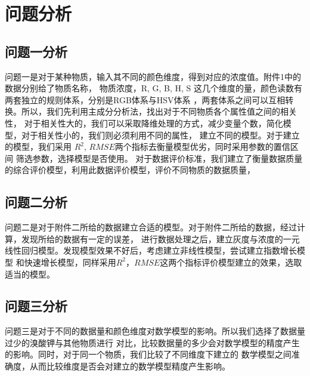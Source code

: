 \section{问题分析}
\subsection{问题一分析}
问题一是对于某种物质，输入其不同的颜色维度，得到对应的浓度值。附件1中的数据分别给了物质名称，
物质浓度，R, G, B, H, S 这几个维度的量，颜色读数有两套独立的规则体系，分别是RGB体系与HSV体系
，两套体系之间可以互相转换。所以，我们先利用主成分分析法，找出对于不同物质各个属性值之间的相关性，
对于相关性大的，我们可以采取降维处理的方式，减少变量个数，简化模型，对于相关性小的，我们则必须利用不同的属性，
建立不同的模型。对于建立的模型，我们采用 $R^2$, $RMSE$两个指标去衡量模型优劣，同时采用参数的置信区间
筛选参数，选择模型是否使用。
对于数据评价标准，我们建立了衡量数据质量的综合评价模型，利用此数据评价模型，评价不同物质的数据质量，

\subsection{问题二分析}
问题二是对于附件二所给的数据建立合适的模型。对于附件二所给的数据，经过计算，发现所给的数据有一定的误差，
进行数据处理之后，建立灰度与浓度的一元线性回归模型。发现模型效果不好后，考虑建立非线性模型，尝试建立指数增长模型
和快速增长模型，同样采用$R^2$，$RMSE$这两个指标评价模型建立的效果，选取适当的模型。

\subsection{问题三分析}
问题三是对于不同的数据量和颜色维度对数学模型的影响。所以我们选择了数据量过少的溴酸钾与其他物质进行
对比，比较数据量的多少会对数学模型的精度产生的影响。同时，对于同一个物质，我们比较了不同维度下建立的
数学模型之间准确度，从而比较维度是否会对建立的数学模型精度产生影响。
